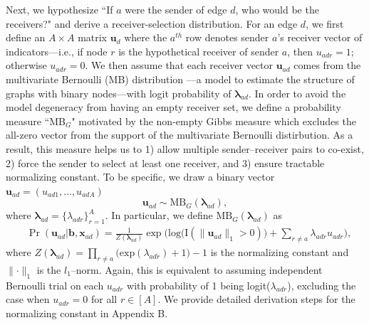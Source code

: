 \documentclass[ba]{imsart}
\numberwithin{equation}{section}
\theoremstyle{plain}
\begin{document}
Next, we hypothesize ``If $a$ were the sender of edge $d$, who would be the receivers?" and derive a receiver-selection distribution. For an edge $d$, we first define an $A\times A$ matrix $\boldsymbol{u}_d$ where the $a^{th}$ row denotes sender $a$'s receiver vector of indicators---i.e., if node $r$ is the hypothetical receiver of sender $a$, then $u_{adr}=1$; otherwise $u_{adr}=0$. We then assume that each receiver vector $\boldsymbol{u}_{ad}$ comes from the multivariate Bernoulli (MB) distribution \citep{dai2013multivariate}---a model to estimate the structure of graphs with binary nodes---with logit probability of $\boldsymbol{\lambda}_{ad}$. In order to avoid the model degeneracy from having an empty receiver set, we define a probability measure ``MB$_{G}$" motivated by the non-empty Gibbs measure \citep{fellows2017removing} which excludes the all-zero vector from the support of the multivariate Bernoulli distirbution. As a result, this measure helps us to 1) allow multiple sender--receiver pairs to co-exist, 2) force the sender to select at least one receiver, and 3) ensure tractable normalizing constant. To be specific, we draw a binary vector $\boldsymbol{u}_{ad}= (u_{ad1},
\ldots, u_{adA})$ 
\begin{equation} \boldsymbol{u}_{ad}  \sim
\mbox{MB}_{G}(\boldsymbol{\lambda}_{ad}),
\end{equation}
where $\boldsymbol{\lambda}_{ad}= \{\lambda_{adr}\}_{r=1}^A$. In particular, we define $\mbox{MB}_{G}(\boldsymbol{\lambda}_{ad})$ as
\begin{equation}
\begin{aligned}
&\Pr(\boldsymbol{u}_{ad}|\boldsymbol{b}, \boldsymbol{x}_{ad}) = \frac{1}{Z(\boldsymbol{\lambda}_{ad})}\exp\Big(\mbox{log}\big(\text{I}( \lVert \boldsymbol{u}_{ad}\rVert_1 > 0 )\big) + \sum_{r\neq a} \lambda_{adr}u_{adr}\Big) ,
\end{aligned}
\label{eqn:Gibbs}
\end{equation}
where $Z(\boldsymbol{\lambda}_{ad})= \prod_{r \neq a} \big(\mbox{exp}(\lambda_{adr}) + 1\big)-1$ is the normalizing constant and $\lVert \cdot \rVert_1$ is the $l_1$--norm. Again, this is equivalent to assuming independent Bernoulli trial on each $u_{adr}$ with probability of 1 being logit($\lambda_{adr}$), excluding the case when $u_{adr}=0$ for all $r \in [A]$. We provide detailed derivation steps for the normalizing constant in Appendix B. 
\end{document}
